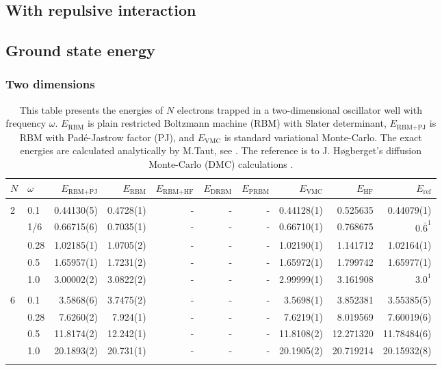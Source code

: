 \begin{landscape}
\section{With repulsive interaction}
\subsection{Ground state energy}
\subsubsection{Two dimensions}
\begin{table} [H]
	\caption{This table presents the energies of $N$ electrons trapped in a two-dimensional oscillator well with frequency $\omega$. $E_{\text{RBM}}$ is plain restricted Boltzmann machine (RBM) with Slater determinant, $E_{\text{RBM+PJ}}$ is RBM with Padé-Jastrow factor (PJ), and $E_{\text{VMC}}$ is standard variational Monte-Carlo. The exact energies are calculated analytically by M.Taut, see \cite{taut_two_1994}. The reference is to J. Høgberget's diffusion Monte-Carlo (DMC) calculations \cite{hogberget_quantum_2013}.} 
	\begin{tabularx}{\hsize}{l:l|RRRRRRRR} \hline\hline
		\label{tab:quantumdotswinteraction2D1}
		$N$ & $\omega$ & $E_{\text{RBM+PJ}}$ & $E_{\text{RBM}}$ & $E_{\text{RBM+HF}}$ & $E_{\text{DRBM}}$ & $E_{\text{PRBM}}$ & $E_{\text{VMC}}$ & $E_{\text{HF}}$ & $E_{\text{ref}}$ \\ \hline \\
		2 & 0.1 & 0.44130(5) & 0.4728(1) & - & - & - & 0.44128(1) & 0.525635 & 0.44079(1) \\ 
		& 1/6 & 0.66715(6) & 0.7035(1) & - & - & - & 0.66710(1) & 0.768675 & $0.\bar{6}^{1}$ \\
		& 0.28 & 1.02185(1) & 1.0705(2) & - & - & - & 1.02190(1) & 1.141712 & 1.02164(1) \\
		& 0.5 & 1.65957(1) & 1.7231(2) & - & - & - & 1.65972(1) & 1.799742 & 1.65977(1)  \\
		& 1.0 & 3.00002(2) & 3.0822(2) & - & - & - & 2.99999(1) & 3.161908 & $3.0^{1}$ \\ \hdashline \\

		6 & 0.1 & 3.5868(6) & 3.7475(2) & - & - & - & 3.5698(1) & 3.852381 & 3.55385(5) \\ 
		& 0.28 & 7.6260(2) & 7.924(1) & - & - & - & 7.6219(1) & 8.019569 & 7.60019(6) \\
		& 0.5 & 11.8174(2) & 12.242(1) & - & - & - & 11.8108(2) & 12.271320 & 11.78484(6) \\
		& 1.0 & 20.1893(2) & 20.731(1) & - & - & - & 20.1905(2) & 20.719214 & 20.15932(8) \\ \hdashline \\
		

\end{tabularx}
\end{table}
\end{landscape}
